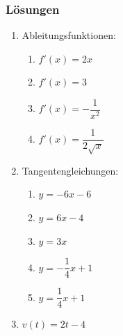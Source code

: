 \clearpage
\subsubsection*{Lösungen}
\begin{enumerate}
    \item Ableitungsfunktionen:
          \begin{enumerate}
              \item \( f'(x) = 2x \)
              \item \( f'(x) = 3 \)
              \item \( f'(x) = -\dfrac{1}{x^2} \)
              \item \( f'(x) = \dfrac{1}{2\sqrt{x}} \)
          \end{enumerate}

    \item Tangentengleichungen:
          \begin{enumerate}
              \item \( y = -6x - 6 \)
              \item \( y = 6x - 4 \)
              \item \( y = 3x \)
              \item \( y = -\dfrac{1}{4}x + 1 \)
              \item \( y = \dfrac{1}{4}x +1\)
          \end{enumerate}
    \item $v(t) = 2t-4$
\end{enumerate}
\clearpage
